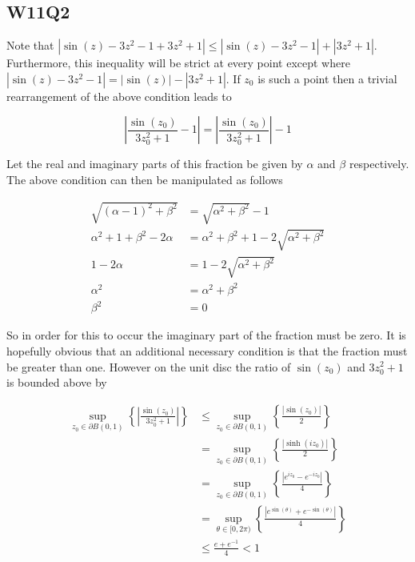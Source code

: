 \documentclass{article}
\begin{document}
\subsection*{W11Q2}
Note that $|\sin(z) - 3z^2 -1 + 3z^2 +1| \leq |\sin(z)-3z^2-1| + |3z^2+1|$. Furthermore, this 
inequality will be strict at every point except where $|\sin(z) - 3z^2-1| = |\sin(z)| - |3z^2+1|$. 
If $z_0$ is such a point then a trivial rearrangement of the above condition leads to 

\begin{equation*}
    \left|\frac{\sin(z_0)}{3z_0^2+1} -1 \right| = \left|\frac{\sin(z_0)}{3z_0^2+1}\right| - 1
\end{equation*}

Let the real and imaginary parts of this fraction be given by $\alpha$ and $\beta$ respectively. 
The above condition can then be manipulated as follows

\begin{align*}
    \sqrt{(\alpha-1)^2 + \beta^2} &= \sqrt{\alpha^2 + \beta^2} - 1\\
    \alpha^2 + 1 + \beta^2 - 2\alpha &= \alpha^2 + \beta^2 +1 -2\sqrt{\alpha^2+\beta^2} \\
    1-2\alpha &= 1 - 2\sqrt{\alpha^2 + \beta^2} \\ 
    \alpha^2 &= \alpha^2 + \beta^2 \\
    \beta^2 &= 0
\end{align*}

So in order for this to occur the imaginary part of the fraction must be zero. It is hopefully obvious 
that an additional necessary condition is that the fraction must be greater than one. However 
on the unit disc the ratio of $\sin(z_0)$ and $3z_0^2+1$ is bounded above by 

\begin{align*}
    \sup_{z_0 \in \partial B(0,1)}\left\{\left|\frac{\sin(z_0)}{3z_0^2+1} \right|\right\} &\leq \sup_{z_0 \in \partial B(0,1)}\left\{\frac{|\sin(z_0)|}{2}\right\} \\
    &= \sup_{z_0 \in \partial B(0,1)}\left\{\frac{|\sinh(iz_0)|}{2}\right\} \\
    &=\sup_{z_0 \in \partial B(0,1)}\left\{\frac{|e^{iz_0}-e^{-iz_0}|}{4}\right\} \\
    &=\sup_{\theta \in [0,2\pi)}\left\{\frac{|e^{\sin(\theta)}+e^{-\sin(\theta)}|}{4}\right\} \\
    &\leq \frac{e+e^{-1}}{4} < 1
\end{align*}
\end{document}
